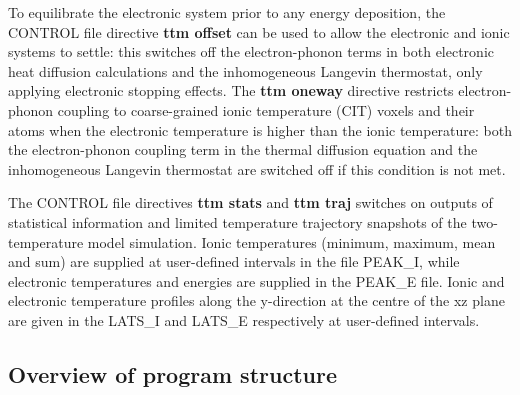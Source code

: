 To equilibrate the electronic system prior to any energy deposition, 
the CONTROL file directive {\bf ttm offset} can be used to allow the 
electronic and ionic systems to settle: this switches off the 
electron-phonon terms in both electronic heat diffusion calculations 
and the inhomogeneous Langevin thermostat, only applying 
electronic stopping effects. The {\bf ttm oneway} directive restricts 
electron-phonon coupling to coarse-grained ionic temperature (CIT) 
voxels and their atoms when the electronic temperature is higher 
than the ionic temperature: both the electron-phonon coupling term 
in the thermal diffusion equation and the inhomogeneous Langevin 
thermostat are switched off if this condition is not met.

The CONTROL file directives {\bf ttm stats} and {\bf ttm traj} switches 
on outputs of statistical information and limited temperature trajectory 
snapshots of the two-temperature model simulation. Ionic 
temperatures (minimum, maximum, mean and sum) are supplied at 
user-defined intervals in the file PEAK\_I, while electronic temperatures 
and energies are supplied in the PEAK\_E file. Ionic and electronic 
temperature profiles along the y-direction at the centre of the xz plane 
are given in the LATS\_I and LATS\_E respectively at user-defined 
intervals.

\subsection*{Overview of program structure}


